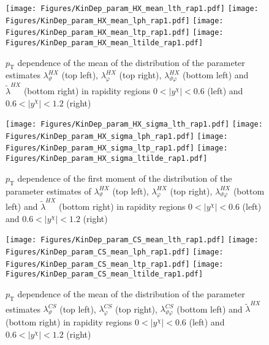 \documentclass[12pt]{article}
\newcommand{\pT}{p_\mathrm{T}}
\newcommand{\absy}{\left |  y^{\chi} \right |}
\newcommand{\lamthCS}{\lambda^{\scriptscriptstyle CS}_\vartheta}
\newcommand{\lamphCS}{\lambda^{\scriptscriptstyle CS}_\varphi}
\newcommand{\lamthphCS}{\lambda^{\scriptscriptstyle CS}_{\vartheta \varphi}}
\newcommand{\lamthHX}{\lambda^{\scriptscriptstyle HX}_\vartheta}
\newcommand{\lamphHX}{\lambda^{\scriptscriptstyle HX}_\varphi}
\newcommand{\lamthphHX}{\lambda^{\scriptscriptstyle HX}_{\vartheta \varphi}}
\newcommand{\lamtildeHX}{\tilde{\lambda}^{\scriptscriptstyle HX}}
\begin{document}



\begin{figure}[htbp]
\centering
\texttt{[image: Figures/KinDep\_param\_HX\_mean\_lth\_rap1.pdf]}
\texttt{[image: Figures/KinDep\_param\_HX\_mean\_lph\_rap1.pdf]}
\texttt{[image: Figures/KinDep\_param\_HX\_mean\_ltp\_rap1.pdf]}
\texttt{[image: Figures/KinDep\_param\_HX\_mean\_ltilde\_rap1.pdf]}
\caption{$\pT$ dependence of the mean of the distribution of the parameter estimates $\lamthHX$ (top left), $\lamphHX$ (top right), $\lamthphHX$
(bottom left) and $\lamtildeHX$ (bottom right) in rapidity regions $0<\absy<0.6$ (left) and $0.6<\absy<1.2$ (right)}
\end{figure}
\clearpage



\begin{figure}[htbp]
\centering
\texttt{[image: Figures/KinDep\_param\_HX\_sigma\_lth\_rap1.pdf]}
\texttt{[image: Figures/KinDep\_param\_HX\_sigma\_lph\_rap1.pdf]}
\texttt{[image: Figures/KinDep\_param\_HX\_sigma\_ltp\_rap1.pdf]}
\texttt{[image: Figures/KinDep\_param\_HX\_sigma\_ltilde\_rap1.pdf]}
\caption{$\pT$ dependence of the first moment of the distribution of the parameter estimates of $\lamthHX$ (top left), $\lamphHX$ (top right), $\lamthphHX$
(bottom left) and $\lamtildeHX$ (bottom right) in rapidity regions $0<\absy<0.6$ (left) and $0.6<\absy<1.2$ (right)}
\end{figure}
\clearpage







\begin{figure}[htbp]
\centering
\texttt{[image: Figures/KinDep\_param\_CS\_mean\_lth\_rap1.pdf]}
\texttt{[image: Figures/KinDep\_param\_CS\_mean\_lph\_rap1.pdf]}
\texttt{[image: Figures/KinDep\_param\_CS\_mean\_ltp\_rap1.pdf]}
\texttt{[image: Figures/KinDep\_param\_CS\_mean\_ltilde\_rap1.pdf]}
\caption{$\pT$ dependence of the mean of the distribution of the parameter estimates $\lamthCS$ (top left), $\lamphCS$ (top right), $\lamthphCS$
(bottom left) and $\lamtildeHX$ (bottom right) in rapidity regions $0<\absy<0.6$ (left) and $0.6<\absy<1.2$ (right)}
\end{figure}
\clearpage
\end{document}
